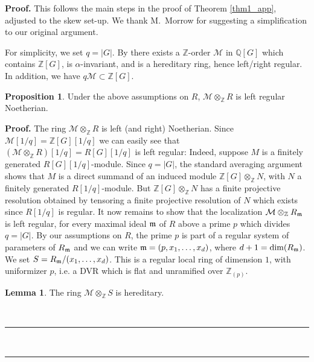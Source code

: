 \documentclass[reqno,11pt,letterpaper]{amsart}
\theoremstyle{plain}
\numberwithin{equation}{subsection}
\newtheorem{proposition}[equation]{Proposition}
\newtheorem{lemma}[equation]{Lemma}
\theoremstyle{remark}
\theoremstyle{plain}
\theoremstyle{definition}\newtheorem*{notation}{Notation}
\newcommand{\Q}{{\mathbb Q}}
\newcommand{\M}{{\mathcal M}}
\newtheorem{lemma}[theorem]{Lemma}
\newtheorem{proposition}[theorem]{Proposition}
\newenvironment{proof}[1][Proof]{\noindent\textbf{#1.} }{\ \rule{0.5em}{0.5em}}
\newcommand{\BZ}{\mathbb{Z}}
\begin{document}
\begin{proof}
This follows the main steps in the proof of Theorem \ref{thm1_app}, adjusted to the skew set-up. We thank M.~Morrow for suggesting a simplification to our original argument. 

For simplicity, we set $q=|G|$. By \cite[Theorem 1.2]{FaJo}  there exists a $\BZ$-order $\M$ in $\Q[G]$ which contains $\BZ[G]$, is $\alpha$-invariant, and is a hereditary  ring, hence left/right regular.
In addition, we have $q\M\subset \BZ[G]$. 

 

\begin{proposition}\label{propB}
Under the above assumptions on $R$,  $\M\otimes_\BZ R$ is left regular Noetherian.
\end{proposition}

\begin{proof}
The ring $\M\otimes_\BZ R$ is left (and right) Noetherian. Since $\M[1/q]=\BZ[G][1/q]$ we can easily see that 
$(\M\otimes_\BZ R)[1/q]=R[G][1/q]$ is left regular: Indeed, suppose $M$ is a finitely generated $R[G][1/q]$-module.  Since $q=|G|$, the standard averaging argument shows that $M$ is a direct summand of an induced module $\BZ[G]\otimes_\BZ N$, with $N$ a finitely generated $R[1/q]$-module. But $\BZ[G]\otimes_\BZ N$ has a finite projective resolution obtained by tensoring a finite projective resolution of $N$ which exists since $R[1/q]$ is regular.  It now remains to show that the localization $\M\otimes_\BZ R_{\frak m}$ is left regular, for  every maximal ideal
$\frak m$ of $R$ above a prime $p$ which divides $q=|G|$. By our assumptions on $R$, the prime $p$ is part of a regular system of parameters of $R_{\frak m}$ and 
we can write ${\frak m}=(p,x_1,\ldots, x_d)$, where $d+1=\dim(R_{\frak m})$.  
We  set $S=R_{\frak m}/(x_1,\ldots, x_d)$. This is a regular local ring of dimension $1$,
with uniformizer $p$, i.e. a DVR which is flat and unramified over $\BZ_{(p)}$. 

\begin{lemma}\label{lemmaB1}
 The ring $\M\otimes_\BZ S$ is hereditary.
 \end{lemma}
 

\end{proof}
\end{proof}
\end{document}
